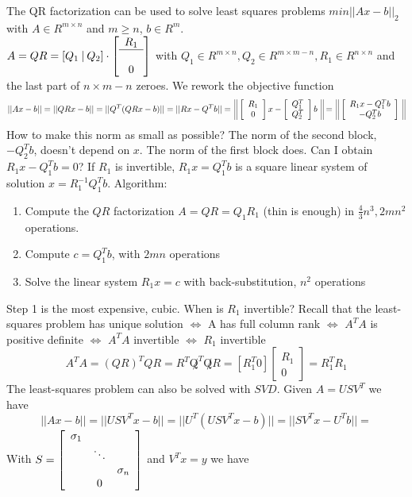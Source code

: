 \documentclass[10pt]{report}
\begin{document}
The QR factorization can be used to solve least squares problems $min ||Ax-b||_2$ with $A\in R^{m\times n}$ and $m\geq n$, $b\in R^m$.\\$A=QR = [Q_1\:|\:Q_2]\cdot\left[\begin{array}{c}
R_1\\\hline\\0
\end{array}\right]$ with $Q_1\in R^{m\times n}, Q_2\in R^{m\times m-n}, R_1\in R^{n\times n}$ and the last part of $n\times m-n$ zeroes. We rework the objective function $$||Ax-b|| = ||QRx-b||=||Q^T(QRx-b)||=||Rx-Q^Tb|| = \:\:\vline\:\vline\left[\begin{array}{c}
R_1\\0
\end{array}\right]x-\left[\begin{array}{c}
Q_1^T\\Q_2^T
\end{array}\right]b\:\:\vline\:\vline = \:\:\vline\:\vline\left[\begin{array}{c}
R_1x-Q_1^Tb\\-Q_2^Tb
\end{array}\right]\:\:\vline\:\vline$$
How to make this norm as small as possible? The norm of the second block, $-Q_2^Tb$, doesn't depend on $x$. The norm of the first block does. Can I obtain $R_1x - Q_1^Tb = 0$? If $R_1$ is invertible, $R_1x=Q_1^Tb$ is a square linear system of solution $x = R_1^{-1}Q_1^Tb$. Algorithm:
\begin{enumerate}
	\item Compute the $QR$ factorization $A = QR = Q_1R_1$ (thin is enough) in $\frac{4}{3}n^3,2mn^2$ operations.
	\item Compute $c = Q_1^Tb$, with $2mn$ operations
	\item Solve the linear system $R_1x=c$ with back-substitution, $n^2$ operations
\end{enumerate}
Step 1 is the most expensive, cubic. When is $R_1$ invertible? Recall that the least-squares problem has unique solution $\Leftrightarrow$ A has full column rank $\Leftrightarrow$ $A^TA$ is positive definite $\Leftrightarrow$ $A^TA$ invertible $\Leftrightarrow$ $R_1$ invertible
$$A^TA = (QR)^TQR = R^T\not Q^T\not QR = [R_1^T 0]\left[\begin{array}{c}
R_1\\0
\end{array}\right] = R_1^TR_1$$
The least-squares problem can also be solved with $SVD$. Given $A=USV^T$ we have $$||Ax-b|| = ||USV^Tx-b|| = ||U^T(USV^Tx - b)|| = ||SV^Tx-U^Tb|| =$$
With $S =\left[\begin{array}{c c c}
\sigma_1\\
& \ddots\\
& & \sigma_n\\
& 0
\end{array}\right]$ and $V^Tx = y$ we have
\end{document}
